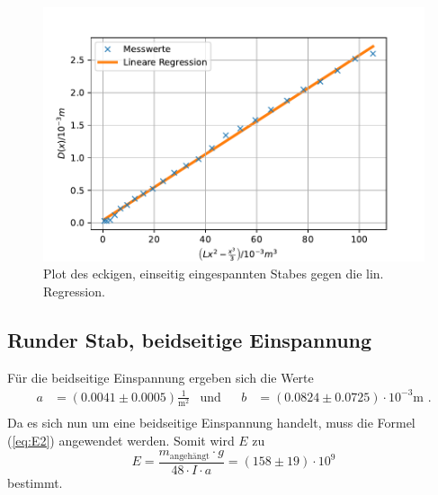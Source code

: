 \begin{figure}[H]
  \centering
  \includegraphics{pictures/Lineare Regression2.pdf}
  \caption{Plot des eckigen, einseitig eingespannten Stabes gegen die lin. Regression.}
  \label{fig:plot2}
\end{figure}


\subsection{Runder Stab, beidseitige Einspannung}

Für die beidseitige Einspannung ergeben sich die Werte
\begin{align*}
  a &= (0.0041 ± 0.0005) \frac{1}{\unit{\meter\squared}} & \text{und}& & b&= (0.0824 ± 0.0725) \cdot 10^{-3} \unit\meter \text{ .} \\
\end{align*}
Da es sich nun um eine beidseitige Einspannung handelt, muss die Formel (\ref{eq:E2}) angewendet werden.
Somit wird $E$ zu
\begin{equation*}
  E = \frac{m_\text{angehängt} \cdot g}{48 \cdot I \cdot a} = (158 \pm 19) \cdot 10^{9}
\end{equation*}
bestimmt.




